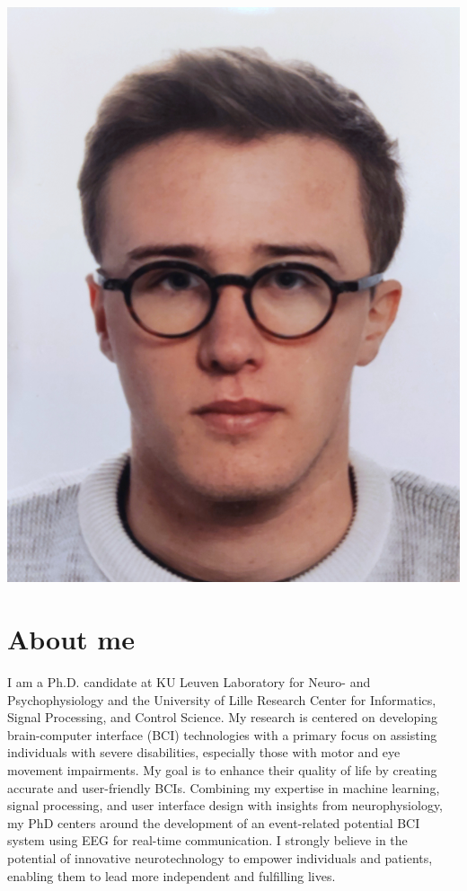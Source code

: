 \documentclass[10pt,a4paper]{article}
\begin{document}
\begin{minipage}[b]{.29\linewidth}
	\includegraphics[width=\linewidth]{photo.jpg}
\end{minipage}


\section*{About me}

I am a Ph.D. candidate at KU Leuven Laboratory for Neuro- and Psychophysiology
and the University of Lille Research Center for Informatics, Signal Processing,
and Control Science. My research is centered on developing brain-computer
interface (BCI) technologies with a primary focus on assisting individuals with
severe disabilities, especially those with motor and eye movement impairments.
My goal is to enhance their quality of life by creating accurate and
user-friendly BCIs. Combining my expertise in machine learning, signal
processing, and user interface design with insights from neurophysiology, my
PhD centers around the development of an event-related potential BCI system
using EEG for real-time communication. I strongly believe in the potential of
innovative neurotechnology to empower individuals and patients, enabling them
to lead more independent and fulfilling lives.
\end{document}
